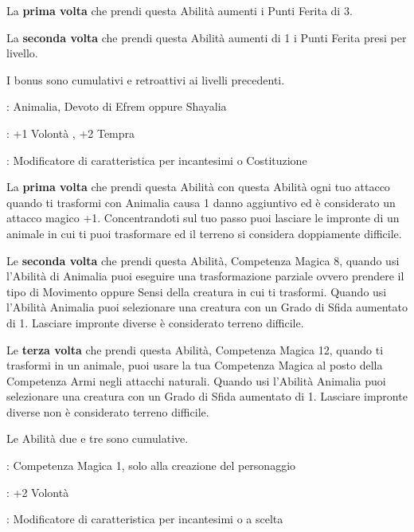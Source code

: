 \begin{multicols}{2}
La \textbf{prima volta} che prendi questa Abilità aumenti i Punti Ferita di 3.

La \textbf{seconda volta} che prendi questa Abilità aumenti di 1 i Punti Ferita presi per livello.

I bonus sono cumulativi e retroattivi ai livelli precedenti.

\begin{description}[noitemsep, topsep=0pt, parsep=0pt, partopsep=0pt, leftmargin=0cm, labelwidth=2.5cm]
    \item[\textbf{Requisito}]: Animalia, Devoto di Efrem oppure Shayalia
    \item[\textbf{Tiri Salvezza}]: +1 Volontà , +2 Tempra
    \item[\textbf{Caratteristica}]: Modificatore di caratteristica per incantesimi o Costituzione
\end{description}

La \textbf{prima volta} che prendi questa Abilità con questa Abilità ogni tuo attacco quando ti trasformi con Animalia causa 1 danno aggiuntivo ed è considerato un attacco magico +1. Concentrandoti sul tuo passo puoi lasciare le impronte di un animale in cui ti puoi trasformare ed il terreno si considera doppiamente difficile.

Le \textbf{seconda volta} che prendi questa Abilità, Competenza Magica 8, quando usi l'Abilità di Animalia puoi eseguire una trasformazione parziale ovvero prendere il tipo di Movimento oppure Sensi della creatura in cui ti trasformi. Quando usi l'Abilità Animalia puoi selezionare una creatura con un Grado di Sfida aumentato di 1. Lasciare impronte diverse è considerato terreno difficile.

Le \textbf{terza volta} che prendi questa Abilità, Competenza Magica 12, quando ti trasformi in un animale, puoi usare la tua Competenza Magica al posto della Competenza Armi negli attacchi naturali. Quando usi l'Abilità Animalia puoi selezionare una creatura con un Grado di Sfida aumentato di 1. Lasciare impronte diverse non è considerato terreno difficile.

Le Abilità due e tre sono cumulative.

\begin{description}[noitemsep, topsep=0pt, parsep=0pt, partopsep=0pt, leftmargin=0cm, labelwidth=2.5cm]
    \item[\textbf{Requisito}]: Competenza Magica 1, solo alla creazione del personaggio
    \item[\textbf{Tiri Salvezza}]: +2 Volontà
    \item[\textbf{Caratteristica}]: Modificatore di caratteristica per incantesimi o a scelta
\end{description}


\end{multicols}
